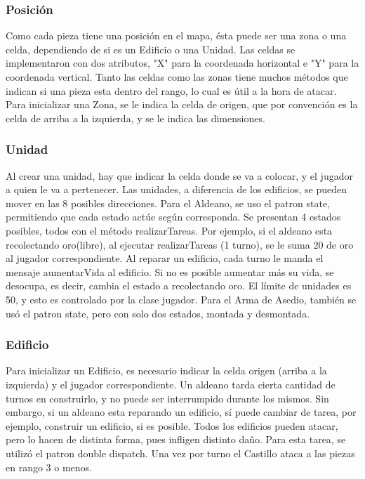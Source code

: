 \documentclass[titlepage,a4paper]{article}
\begin{document}
\subsubsection{Posición}

Como cada pieza tiene una posición en el mapa, ésta puede ser una zona o una celda, dependiendo de si es un Edificio o una Unidad. 
Las celdas se implementaron con dos atributos, "X" para la coordenada horizontal e "Y" para la coordenada vertical. 
Tanto las celdas como las zonas tiene muchos métodos que indican si una pieza esta dentro del rango, lo cual es útil a la hora de atacar. 
Para inicializar una Zona, se le indica la celda de origen, que por convención es la celda de arriba a la izquierda, y se le indica las dimensiones. 

\subsubsection{Unidad}
Al crear una unidad, hay que indicar la celda donde se va a colocar, y el jugador a quien le va a pertenecer. 
Las unidades, a diferencia de los edificios, se pueden mover en las 8 posibles direcciones. 
Para el Aldeano, se uso el patron state, permitiendo que cada estado actúe según corresponda. Se presentan 4 estados posibles, todos con el método realizarTareas. Por ejemplo, si el aldeano esta recolectando oro(libre), al ejecutar realizarTareas (1 turno), se le suma 20 de oro al jugador correspondiente. 
Al reparar un edificio, cada turno le manda el mensaje aumentarVida al edificio. Si no es posible aumentar más su vida, se desocupa, es decir, cambia el estado a recolectando oro. 
El límite de unidades es 50, y esto es controlado por la clase jugador.
Para el Arma de Asedio, también se usó el patron state, pero con solo dos estados, montada y desmontada. 

\subsubsection{Edificio}
Para inicializar un Edificio, es necesario indicar la celda origen (arriba a la izquierda) y el jugador correspondiente. 
Un aldeano tarda cierta cantidad de turnos en construirlo, y no puede ser interrumpido durante los mismos. Sin embargo, si un aldeano esta reparando un edificio, sí puede cambiar de tarea, por ejemplo, construir un edificio, si es posible. 
Todos los edificios pueden atacar, pero lo hacen de distinta forma, pues infligen distinto daño. Para esta tarea, se utilizó el patron double dispatch.
Una vez por turno el Castillo ataca a las piezas en rango 3 o menos.
\end{document}
